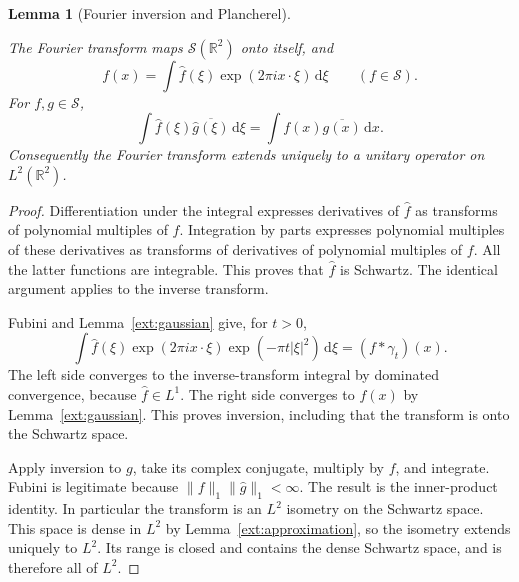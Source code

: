 \documentclass[11pt]{amsart}
\newcommand{\R}{\mathbb R}
\newcommand{\dd}{\,\mathrm d}
\newtheorem{lemma}[theorem]{Lemma}
\theoremstyle{definition}
\theoremstyle{remark}
\numberwithin{equation}{section}
\providecommand{\lean}[1]{}
\providecommand{\leanok}{}
\begin{document}
\begin{lemma}[Fourier inversion and Plancherel]\label{ext:fourier}
\lean{Auto.ext_fourier_maps,Auto.ext_fourier_onto,Auto.ext_fourier_inversion,Auto.ext_fourier_plancherel,Auto.ext_fourier_unitary}
\leanok
The Fourier transform maps $\mathcal S(\R^2)$ onto itself, and
\[
 f(x)=\int\widehat f(\xi)\exp(2\pi i x\cdot\xi)\dd\xi
 \qquad(f\in\mathcal S).
\]
For $f,g\in\mathcal S$,
\[
 \int\widehat f(\xi)\overline{\widehat g(\xi)}\dd\xi
       =\int f(x)\overline{g(x)}\dd x.
\]
Consequently the Fourier transform extends uniquely to a unitary
operator on $L^2(\R^2)$.
\end{lemma}
\begin{proof}
Differentiation under the integral expresses derivatives of
$\widehat f$ as transforms of polynomial multiples of $f$.
Integration by parts expresses polynomial multiples of these
derivatives as transforms of derivatives of polynomial multiples
of $f$.  All the latter functions are integrable.  This proves
that $\widehat f$ is Schwartz.  The identical argument applies
to the inverse transform.

Fubini and Lemma~\ref{ext:gaussian} give, for $t>0$,
\[
 \int\widehat f(\xi)\exp(2\pi i x\cdot\xi)
                         \exp(-\pi t|\xi|^2)\dd\xi
       =(f*\gamma_t)(x).
\]
The left side converges to the inverse-transform integral by
dominated convergence, because $\widehat f\in L^1$.  The right
side converges to $f(x)$ by Lemma~\ref{ext:gaussian}.  This proves
inversion, including that the transform is onto the Schwartz space.

Apply inversion to $g$, take its complex conjugate, multiply by
$f$, and integrate.  Fubini is legitimate because
$\|f\|_1\|\widehat g\|_1<\infty$.  The result is the inner-product
identity.  In particular the transform is an $L^2$ isometry on
the Schwartz space.  This space is dense in $L^2$ by
Lemma~\ref{ext:approximation}, so the isometry extends uniquely
to $L^2$.  Its range is closed and contains the dense Schwartz
space, and is therefore all of $L^2$.
\end{proof}
\end{document}
